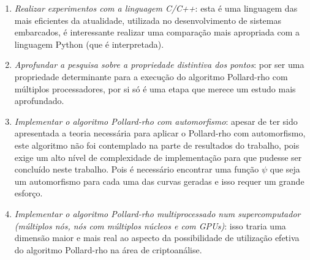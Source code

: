 \begin{enumerate}
	\item \textit{Realizar experimentos com a linguagem C/C++}: esta é uma linguagem das mais eficientes da atualidade, utilizada no desenvolvimento de sistemas embarcados, é interessante realizar uma comparação mais apropriada com a linguagem Python (que é interpretada).
	\item \textit{Aprofundar a pesquisa sobre a propriedade distintiva dos pontos}: por ser uma propriedade determinante para a execução do algoritmo Pollard-rho com múltiplos processadores, por si só é uma etapa que merece um estudo mais aprofundado.
	\item \textit{Implementar o algoritmo Pollard-rho com automorfismo}: apesar de ter sido apresentada a teoria necessária para aplicar o Pollard-rho com automorfismo, este algoritmo não foi contemplado na parte de resultados do trabalho, pois exige um alto nível de complexidade de implementação para que pudesse ser concluído neste trabalho. Pois é necessário encontrar uma função \(\psi\) que seja um automorfismo para cada uma das curvas geradas e isso requer um grande esforço.
	\item \textit{Implementar o algoritmo Pollard-rho multiprocessado num supercomputador (múltiplos nós, nós com múltiplos núcleos e com GPUs)}: isso traria uma dimensão maior e mais real ao aspecto da possibilidade de utilização efetiva do algoritmo Pollard-rho na área de criptoanálise.
\end{enumerate}
